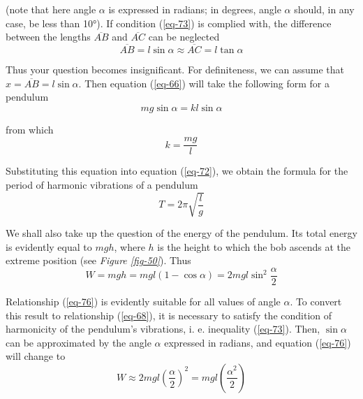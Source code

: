 \documentclass[a4paper,sfsidenotes]{tufte-book}
\begin{document}
(note that here angle $\alpha$ is expressed in radians; in degrees, angle $\alpha$ should, in any case, be less than \ang{10}). If condition (\ref{eq-73}) is complied with, the difference between the lengths $\overline{AB}$ and $\overline{AC}$ can be neglected \\
\begin{equation*}
\overline{AB} = l \sin \alpha \approx \overline{AC} = l \tan \alpha
\end{equation*}

Thus your question becomes insignificant. For definiteness, we can assume that $x = \overline{AB}=l \sin \alpha$. Then equation (\ref{eq-66}) will take the following form for a pendulum \\
\begin{equation}
mg \sin \alpha = k l \sin \alpha
\tag{66a}
\label{eq-66a}
\end{equation}

from which\\

\begin{equation}
k= \frac{mg}{l}
\label{eq-74}
\end{equation}

Substituting this equation into equation (\ref{eq-72}), we obtain the formula for the period of harmonic vibrations of a pendulum
\\
\begin{equation}
T=2 \pi \sqrt{\frac{l}{g}}
\label{eq-75}
\end{equation}

We shall also take up the question of the energy of the pendulum. Its total energy is evidently equal to $mgh$, where $h$ is the height to which the bob ascends at the extreme position (see \emph{Figure \ref{fig-50}}). Thus
\\
\begin{equation}
W = mgh = mgl \left( 1- \cos \alpha \right) = 2mgl \sin^{2} \frac{\alpha}{2}
\label{eq-76}
\end{equation}

Relationship (\ref{eq-76}) is evidently suitable for all values of angle $\alpha$. To convert this result to relationship (\ref{eq-68}), it is necessary to satisfy the condition of harmonicity of the pendulum's vibrations, i. e. inequality (\ref{eq-73}). Then, $\sin \alpha$ can be approximated by the angle $\alpha$ expressed in radians, and equation (\ref{eq-76}) will change to
\\
\begin{equation*}
W \approx 2 m g l \left( \frac{\alpha}{2}\right)^{2} = mgl \left( \frac{\alpha^{2}}{2}\right)
\end{equation*}
\end{document}
